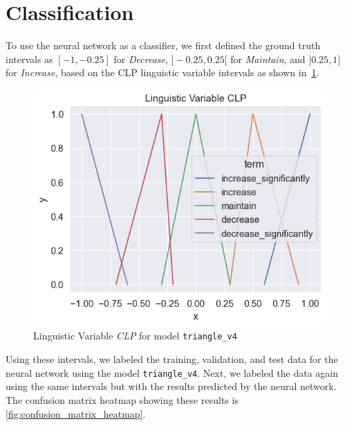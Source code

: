 \documentclass[titlepage]{article}
\begin{document}
\section{Classification}

To use the neural network as a classifier, we first defined the ground truth intervals as \([-1, -0.25]\) for \emph{Decrease}, \(]-0.25, 0.25[\) for \emph{Maintain}, and \(]0.25, 1]\) for \emph{Increase}, based on the CLP linguistic variable intervals as shown in~\cref{fig:triangle_v4_clp_repeated}.

\begin{figure}[H]
    \centering
    \includegraphics[scale=0.6]{../../fuzzy/output/mamdani_triangular_v4/io_graphs/CLP}
    \caption{Linguistic Variable \emph{CLP} for model \texttt{triangle\_v4}}
    \label{fig:triangle_v4_clp_repeated}
\end{figure}


Using these intervals, we labeled the training, validation, and test data for the neural network using the model \texttt{triangle\_v4}.
Next, we labeled the data again using the same intervals but with the results predicted by the neural network.
The confusion matrix heatmap showing these results is \cref{fig:confusion_matrix_heatmap}.
\end{document}
